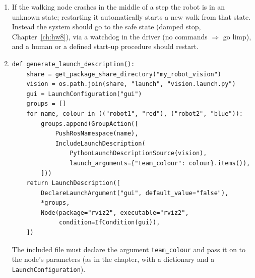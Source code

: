 \begin{enumerate}[label=\textbf{\ansnum.\arabic*}]
  \item If the walking node crashes in the middle of a step the robot is in an unknown state; restarting it automatically starts a new walk from that state. Instead the system should go to the safe state (damped stop, Chapter~\ref{ch:hw8}), via a watchdog in the driver (no commands $\Rightarrow$ go limp), and a human or a defined start-up procedure should restart.
  \item[\textbf{\ansnum.10}]
\begin{verbatim}
def generate_launch_description():
    share = get_package_share_directory("my_robot_vision")
    vision = os.path.join(share, "launch", "vision.launch.py")
    gui = LaunchConfiguration("gui")
    groups = []
    for name, colour in (("robot1", "red"), ("robot2", "blue")):
        groups.append(GroupAction([
            PushRosNamespace(name),
            IncludeLaunchDescription(
                PythonLaunchDescriptionSource(vision),
                launch_arguments={"team_colour": colour}.items()),
        ]))
    return LaunchDescription([
        DeclareLaunchArgument("gui", default_value="false"),
        *groups,
        Node(package="rviz2", executable="rviz2",
             condition=IfCondition(gui)),
    ])
\end{verbatim}
  The included file must declare the argument \verb!team_colour! and pass it on to the node's parameters (as in the chapter, with a dictionary and a \verb!LaunchConfiguration!).
\end{enumerate}
